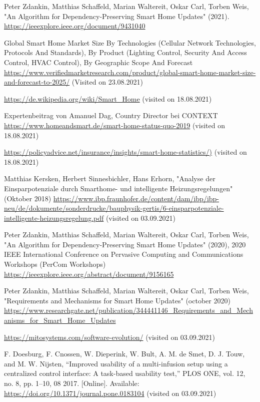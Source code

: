 \begin{thebibliography}{9}

Peter Zdankin, Matthias Schaffeld, Marian Waltereit, Oskar Carl, Torben Weis, "An Algorithm for Dependency-Preserving Smart Home Updates" (2021).
\url{https://ieeexplore.ieee.org/document/9431040}

Global Smart Home Market Size By Technologies (Cellular Network Technologies, Protocols And Standards), By Product
(Lighting Control, Security And Access Control, HVAC Control), By Geographic Scope And Forecast
\url{https://www.verifiedmarketresearch.com/product/global-smart-home-market-size-and-forecast-to-2025/} (Visited on 23.08.2021)

\url{https://de.wikipedia.org/wiki/Smart_Home} (visited on 18.08.2021)

Expertenbeitrag von Amanuel Dag, Country Director bei CONTEXT
\url{https://www.homeandsmart.de/smart-home-status-quo-2019} (visited on 18.08.2021)

\url{https://policyadvice.net/insurance/insights/smart-home-statistics/)} (visited on 18.08.2021)

Matthias Kersken, Herbert Sinnesbichler, Hans Erhorn, "Analyse der Einsparpotenziale durch Smarthome- und intelligente Heizungsregelungen" (Oktober 2018)
\url{https://www.ibp.fraunhofer.de/content/dam/ibp/ibp-neu/de/dokumente/sonderdrucke/bauphysik-gertis/6-einsparpotenziale-intelligente-heizungsregelung.pdf} (visited on 03.09.2021)

Peter Zdankin, Matthias Schaffeld, Marian Waltereit, Oskar Carl, Torben Weis, "An Algorithm for Dependency-Preserving Smart Home Updates" (2020),
2020 IEEE International Conference on Pervasive Computing and Communications Workshops (PerCom Workshops)
\url{https://ieeexplore.ieee.org/abstract/document/9156165}

Peter Zdankin, Matthias Schaffeld, Marian Waltereit, Oskar Carl, Torben Weis, "Requirements and Mechanisms for Smart Home Updates" (october 2020)
\url{https://www.researchgate.net/publication/344441146_Requirements_and_Mechanisms_for_Smart_Home_Updates}

\url{https://mitosystems.com/software-evolution/} (visited on 03.09.2021)

F. Doesburg, F. Cnossen, W. Dieperink, W. Bult, A. M. de Smet, D. J.
Touw, and M. W. Nijsten, “Improved usability of a multi-infusion
setup using a centralized control interface: A task-based usability test,”
PLOS ONE, vol. 12, no. 8, pp. 1–10, 08 2017. [Online]. Available:
\url{https://doi.org/10.1371/journal.pone.0183104} (visited on 03.09.2021)


\end{thebibliography}
